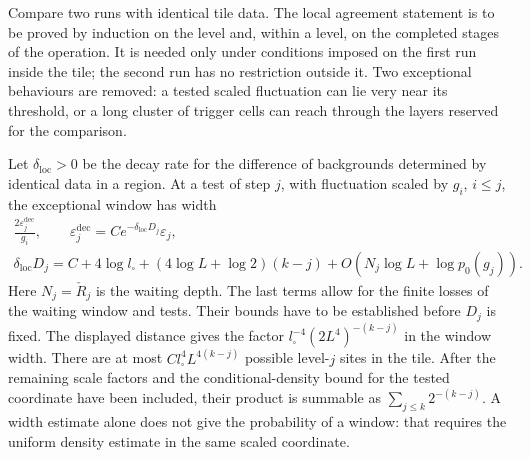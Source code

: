 \documentclass[11pt,letterpaper,reqno]{amsart}
\theoremstyle{definition}
\theoremstyle{remark}
\begin{document}
Compare two runs with identical tile data. The local agreement
statement is to be proved by induction on the level and, within
a level, on the completed stages of the operation. It is needed
only under conditions imposed on the first run inside the tile;
the second run has no restriction outside it. Two exceptional
behaviours are removed: a tested scaled fluctuation can lie very
near its threshold, or a long cluster of trigger cells can reach
through the layers reserved for the comparison.

Let $\delta_{\mathrm{loc}}>0$ be the decay rate for the difference
of backgrounds determined by identical data in a region. At a
test of step $j$, with fluctuation scaled by $g_i$, $i\le j$,
the exceptional window has width
\begin{equation}\label{eq:history-decoupling-window}
 \begin{gathered}
 \frac{2\varepsilon_j^{\mathrm{dec}}}{g_i},\qquad
 \varepsilon_j^{\mathrm{dec}}
             =Ce^{-\delta_{\mathrm{loc}}D_j}\varepsilon_j,\\
 \delta_{\mathrm{loc}}D_j
   =C+4\log l_\square+(4\log L+\log2)(k-j)
                  +O(N_j\log L+\log p_0(g_j)).
 \end{gathered}
\end{equation}
Here $N_j=\check R_j$ is the waiting depth. The last terms allow
for the finite losses of the waiting window and tests. Their bounds
have to be established before $D_j$ is
fixed. The displayed distance gives the factor
$l_\square^{-4}(2L^4)^{-(k-j)}$ in the window width. There are
at most $Cl_\square^4L^{4(k-j)}$ possible level-$j$ sites in the
tile. After the remaining scale factors and the conditional-density
bound for the tested coordinate have been included, their product
is summable as $\sum_{j\le k}2^{-(k-j)}$. A width estimate alone
does not give the probability of a window: that requires the
uniform density estimate in the same scaled coordinate.
\end{document}

